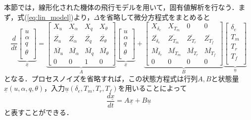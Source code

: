 本節では，線形化された機体の飛行モデルを用いて，固有値解析を行なう．まず，式(\ref{eq:lin_model})より，$\Delta$を省略して微分方程式をまとめると
\begin{equation}
  \dfrac{d}{dt}
  \underbrace{
  \left[
  \begin{array}{cccc}
    u \\
    \alpha \\
    q \\
    \theta \\
  \end{array}
  \right]}_{\underline{x}} =
  \underbrace{
  \left[
  \begin{array}{cccc}
    X_u & X_\alpha & X_q & X_\theta \\
    \overline{Z_u} & \overline{Z_\alpha} & \overline{Z_q} & \overline{Z_\theta} \\
    \overline{M_u} & \overline{M_\alpha} & \overline{M_q} & \overline{M_\theta} \\
    0 & 0 & 1 & 0
  \end{array}
  \right]}_{A}
  \underbrace{
  \left[
  \begin{array}{cccc}
    u \\
    \alpha \\
    q \\
    \theta \\
  \end{array}
  \right]}_{\underline{x}} +
  \underbrace{
  \left[
  \begin{array}{cccc}
    X_{\delta_e} & X_{T_m} & 0 & 0 \\
    \overline{Z_{\delta_e}} & \overline{Z_{T_m}} & \overline{Z_{T_r}} & \overline{Z_{T_f}} \\
    \overline{M_{\delta_e}} & \overline{M_{T_m}} & \overline{M_{T_r}} & \overline{M_{T_f}} \\
    0 & 0 & 0 & 0
  \end{array}
  \right]}_{B}
  \underbrace{
  \left[
  \begin{array}{cccc}
    \delta_e \\
    T_m \\
    T_r \\
    T_f \\
  \end{array}
  \right]}_{\underline{u}}
\end{equation}
となる．プロセスノイズを省略すれば，この状態方程式は行列$A,B$と状態量$\underline{x}(u,\alpha,q,\theta)$，入力$\underline{u}(\delta_e,T_m,T_r,T_f)$を用いることによって
\begin{equation}
  \dfrac{d\underline{x}}{dt} = A\underline{x} + B\underline{u}
\label{eq:matrix_A}
\end{equation}
と表すことができる．



